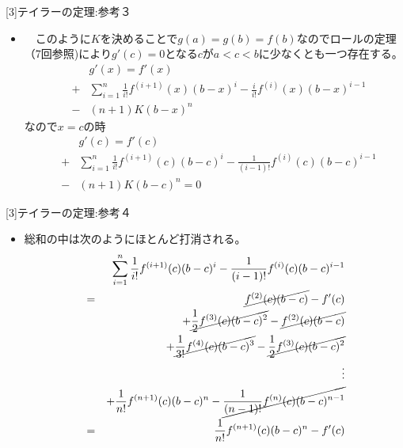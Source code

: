 \begin{slide}{[3]テイラーの定理:参考３}
\begin{itemize}
\item　このように$K$を決めることで$g(a)=g(b)=f(b)$なのでロールの定理（7回参照)により$g'(c)=0$となる$c$が$a<c<b$に少なくとも一つ存在する。
\begin{eqnarray}
&& g'(x) = f'(x) \nonumber  \\
&+& \sum_{i=1}^n \frac{1}{i!}f^{(i+1)}(x)(b-x)^i - \frac{i}{i!}f^{(i)}(x)(b-x)^{i-1} \nonumber \\
&-& (n+1)K(b-x)^{n} \nonumber
\end{eqnarray}
なので$x=c$の時
\begin{eqnarray}
&& g'(c) = f'(c) \nonumber \\
 &+& \sum_{i=1}^n \frac{1}{i!}f^{(i+1)}(c)(b-c)^i - \frac{1}{(i-1)!}f^{(i)}(c)(b-c)^{i-1} \nonumber \\
 &-& (n+1)K(b-c)^{n} = 0 \nonumber
\end{eqnarray}
\end{itemize}
\end{slide}
\begin{slide}{[3]テイラーの定理:参考４}
\begin{itemize}
\item 総和の中は次のようにほとんど打消される。
\begin{eqnarray}
&&\sum_{i=1}^n \frac{1}{i!}f^{(i+1)}(c)(b-c)^i - \frac{1}{(i-1)!}f^{(i)}(c)(b-c)^{i-1} \nonumber \\
&=& \cancel{f^{(2)}(c)(b-c)} - f'(c) \nonumber \\
&& + \cancel{\frac{1}{2}f^{(3)}(c)(b-c)^2}  - \cancel{f^{(2)}(c)(b-c)} \nonumber \\
&& + \cancel{\frac{1}{3!}f^{(4)}(c)(b-c)^3} - \cancel{\frac{1}{2}f^{(3)}(c)(b-c)^2} \nonumber \\
&& \vdots \nonumber \\
&& + \frac{1}{n!}f^{(n+1)}(c)(b-c)^n- \cancel{\frac{1}{(n-1)!}f^{(n)}(c)(b-c)^{n-1}} \nonumber \\
&=&  \frac{1}{n!}f^{(n+1)}(c)(b-c)^n - f'(c) \label{eq:taylorsum}
\end{eqnarray}
\end{itemize}
\end{slide}
